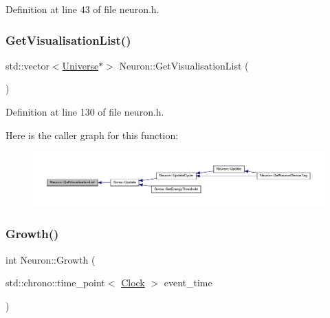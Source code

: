 Definition at line 43 of file neuron.\+h.

\mbox{\label{class_neuron_a9af31418d1232135bf5074f6a3d5dbf1}} 
\subsubsection{\texorpdfstring{Get\+Visualisation\+List()}{GetVisualisationList()}}
{\footnotesize\ttfamily std\+::vector$<$\hyperlink{class_universe}{Universe}$\ast$$>$ Neuron\+::\+Get\+Visualisation\+List (\begin{DoxyParamCaption}{ }\end{DoxyParamCaption})\hspace{0.3cm}{\ttfamily [inline]}}



Definition at line 130 of file neuron.\+h.

Here is the caller graph for this function\+:
\nopagebreak
\begin{figure}[H]
\begin{center}
\leavevmode
\includegraphics[width=350pt]{class_neuron_a9af31418d1232135bf5074f6a3d5dbf1_icgraph}
\end{center}
\end{figure}
\mbox{\label{class_neuron_a82b34717999a29e5413ebfcfa58c9356}} 
\subsubsection{\texorpdfstring{Growth()}{Growth()}}
{\footnotesize\ttfamily int Neuron\+::\+Growth (\begin{DoxyParamCaption}\item[{std\+::chrono\+::time\+\_\+point$<$ \hyperlink{universe_8h_a0ef8d951d1ca5ab3cfaf7ab4c7a6fd80}{Clock} $>$}]{event\+\_\+time }\end{DoxyParamCaption})}



